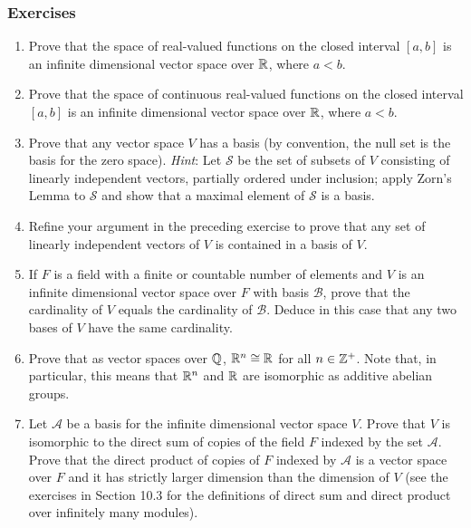 \documentclass[../notes.tex]{subfiles}
\begin{document}
\subsubsection*{Exercises}
\begin{enumerate}[label={\textbf{\arabic*.}},ref={11.1.\arabic*},start=4]
    \item \label{exr:11.1.4}Prove that the space of real-valued functions on the closed interval $[a,b]$ is an infinite dimensional vector space over $\mathbb{R}$, where $a<b$.
    \item \label{exr:11.1.5}Prove that the space of continuous real-valued functions on the closed interval $[a,b]$ is an infinite dimensional vector space over $\mathbb{R}$, where $a<b$.
    \setcounter{enumi}{9}
    \item \label{exr:11.1.10}Prove that any vector space $V$ has a basis (by convention, the null set is the basis for the zero space). \emph{Hint}: Let $\mathcal{S}$ be the set of subsets of $V$ consisting of linearly independent vectors, partially ordered under inclusion; apply Zorn's Lemma to $\mathcal{S}$ and show that a maximal element of $\mathcal{S}$ is a basis.
    \item \label{exr:11.1.11}Refine your argument in the preceding exercise to prove that any set of linearly independent vectors of $V$ is contained in a basis of $V$.
    \item \label{exr:11.1.12}If $F$ is a field with a finite or countable number of elements and $V$ is an infinite dimensional vector space over $F$ with basis $\mathcal{B}$, prove that the cardinality of $V$ equals the cardinality of $\mathcal{B}$. Deduce in this case that any two bases of $V$ have the same cardinality.
    \item \label{exr:11.1.13}Prove that as vector spaces over $\mathbb{Q}$, $\mathbb{R}^n\cong\mathbb{R}$ for all $n\in\mathbb{Z}^+$. Note that, in particular, this means that $\mathbb{R}^n$ and $\mathbb{R}$ are isomorphic as additive abelian groups.
    \item \label{exr:11.1.14}Let $\mathcal{A}$ be a basis for the infinite dimensional vector space $V$. Prove that $V$ is isomorphic to the direct sum of copies of the field $F$ indexed by the set $\mathcal{A}$. Prove that the direct product of copies of $F$ indexed by $\mathcal{A}$ is a vector space over $F$ and it has strictly larger dimension than the dimension of $V$ (see the exercises in Section 10.3 for the definitions of direct sum and direct product over infinitely many modules).
\end{enumerate}
\end{document}
